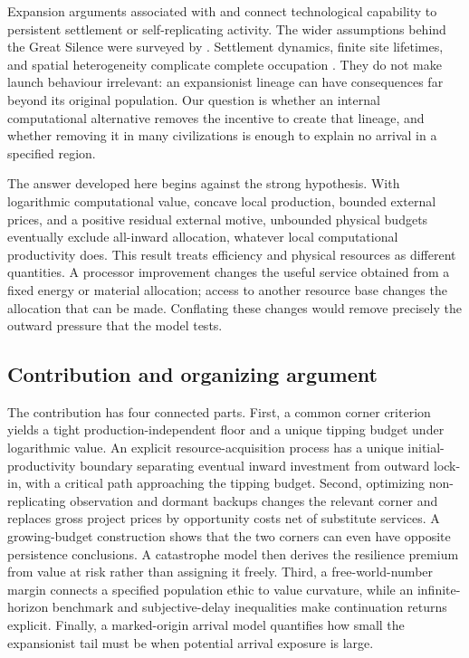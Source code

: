 \documentclass[11pt,a4paper]{article}
\theoremstyle{definition}\newtheorem{definition}{Definition}
\begin{document}
Expansion arguments associated with \citet{Hart1975} and \citet{Tipler1980}
connect technological capability to persistent settlement or self-replicating
activity. The wider assumptions behind the Great Silence were surveyed by
\citet{Brin1983}. Settlement dynamics, finite site lifetimes, and spatial
heterogeneity complicate complete occupation \citep{NewmanSagan1981,CarrollNellenback2019}.
They do not make launch behaviour irrelevant: an expansionist lineage can
have consequences far beyond its original population. Our question is
whether an internal computational alternative removes the incentive to
create that lineage, and whether removing it in many civilizations is enough
to explain no arrival in a specified region.

The answer developed here begins against the strong hypothesis. With
logarithmic computational value, concave local production, bounded external
prices, and a positive residual external motive, unbounded physical budgets
eventually exclude all-inward allocation, whatever local computational
productivity does. This result treats efficiency and physical resources as
different quantities. A processor improvement changes the useful service
obtained from a fixed energy or material allocation; access to another
resource base changes the allocation that can be made. Conflating these
changes would remove precisely the outward pressure that the model tests.

\subsection{Contribution and organizing argument}
The contribution has four connected parts. First, a common corner criterion
yields a tight production-independent floor and a unique tipping budget
under logarithmic value. An explicit resource-acquisition process has a
unique initial-productivity boundary separating eventual inward investment
from outward lock-in, with a critical path approaching the tipping budget.
Second, optimizing non-replicating observation and dormant backups changes
the relevant corner and replaces gross project prices by opportunity costs
net of substitute services. A growing-budget construction shows that the two corners can even have opposite persistence conclusions. A catastrophe model then derives the resilience
premium from value at risk rather than assigning it freely. Third, a
free-world-number margin connects a specified population ethic to value
curvature, while an infinite-horizon benchmark and subjective-delay
inequalities make continuation returns explicit. Finally, a marked-origin
arrival model quantifies how small the expansionist tail must be when
potential arrival exposure is large.
\end{document}
